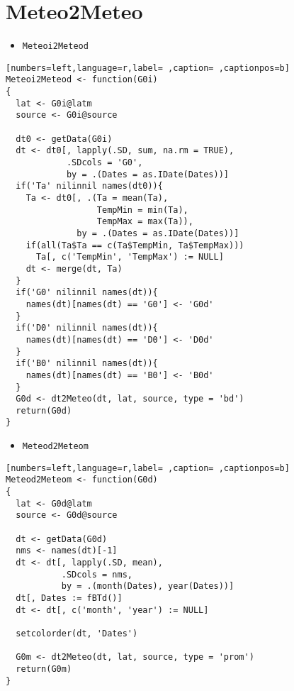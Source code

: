 \section{Meteo2Meteo}
\label{sec:org8f8860d}
\begin{itemize}
\item \texttt{Meteoi2Meteod}
\end{itemize}
\begin{lstlisting}[numbers=left,language=r,label= ,caption= ,captionpos=b]
Meteoi2Meteod <- function(G0i)
{
  lat <- G0i@latm
  source <- G0i@source

  dt0 <- getData(G0i)
  dt <- dt0[, lapply(.SD, sum, na.rm = TRUE),
            .SDcols = 'G0',
            by = .(Dates = as.IDate(Dates))]
  if('Ta' nilinnil names(dt0)){
    Ta <- dt0[, .(Ta = mean(Ta),
                  TempMin = min(Ta),
                  TempMax = max(Ta)),
              by = .(Dates = as.IDate(Dates))]
    if(all(Ta$Ta == c(Ta$TempMin, Ta$TempMax)))
      Ta[, c('TempMin', 'TempMax') := NULL]
    dt <- merge(dt, Ta)
  }
  if('G0' nilinnil names(dt)){
    names(dt)[names(dt) == 'G0'] <- 'G0d'
  }
  if('D0' nilinnil names(dt)){
    names(dt)[names(dt) == 'D0'] <- 'D0d'
  }
  if('B0' nilinnil names(dt)){
    names(dt)[names(dt) == 'B0'] <- 'B0d'
  }
  G0d <- dt2Meteo(dt, lat, source, type = 'bd')
  return(G0d)
}
\end{lstlisting}
\begin{itemize}
\item \texttt{Meteod2Meteom}
\end{itemize}
\begin{lstlisting}[numbers=left,language=r,label= ,caption= ,captionpos=b]
Meteod2Meteom <- function(G0d)
{
  lat <- G0d@latm
  source <- G0d@source

  dt <- getData(G0d)
  nms <- names(dt)[-1]
  dt <- dt[, lapply(.SD, mean),
           .SDcols = nms,
           by = .(month(Dates), year(Dates))]
  dt[, Dates := fBTd()]
  dt <- dt[, c('month', 'year') := NULL]

  setcolorder(dt, 'Dates')

  G0m <- dt2Meteo(dt, lat, source, type = 'prom')
  return(G0m)
}
\end{lstlisting}
